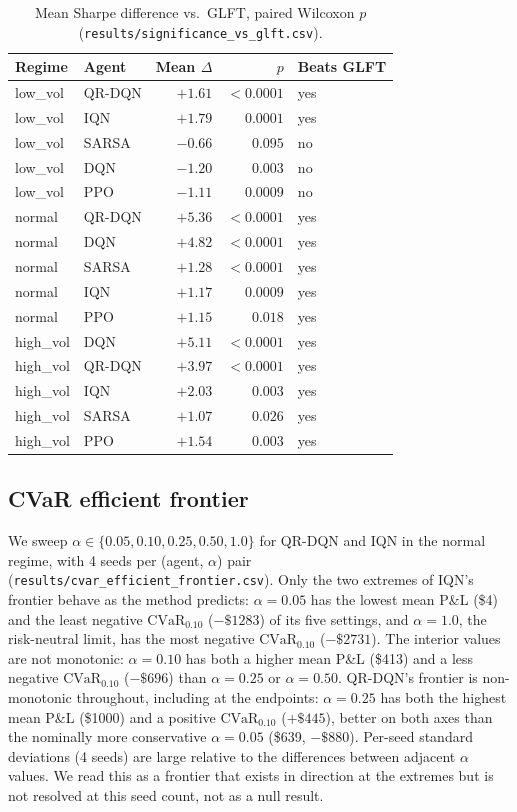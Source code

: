 \documentclass[10pt,twocolumn]{article}
\begin{document}
\begin{table}[t]
\centering\footnotesize
\begin{tabular}{llrrl}
\toprule
Regime & Agent & Mean $\Delta$ & $p$ & Beats GLFT \\
\midrule
low\_vol  & QR-DQN & $+1.61$ & $<0.0001$ & yes \\
low\_vol  & IQN    & $+1.79$ & $0.0001$  & yes \\
low\_vol  & SARSA  & $-0.66$ & $0.095$   & no \\
low\_vol  & DQN    & $-1.20$ & $0.003$   & no \\
low\_vol  & PPO    & $-1.11$ & $0.0009$  & no \\
normal    & QR-DQN & $+5.36$ & $<0.0001$ & yes \\
normal    & DQN    & $+4.82$ & $<0.0001$ & yes \\
normal    & SARSA  & $+1.28$ & $<0.0001$ & yes \\
normal    & IQN    & $+1.17$ & $0.0009$  & yes \\
normal    & PPO    & $+1.15$ & $0.018$   & yes \\
high\_vol & DQN    & $+5.11$ & $<0.0001$ & yes \\
high\_vol & QR-DQN & $+3.97$ & $<0.0001$ & yes \\
high\_vol & IQN    & $+2.03$ & $0.003$   & yes \\
high\_vol & SARSA  & $+1.07$ & $0.026$   & yes \\
high\_vol & PPO    & $+1.54$ & $0.003$   & yes \\
\bottomrule
\end{tabular}
\caption{Mean Sharpe difference vs.\ GLFT, paired Wilcoxon $p$ (\texttt{results/significance\_vs\_glft.csv}).}
\label{tab:glft}
\end{table}

\subsection{CVaR efficient frontier}
We sweep $\alpha\in\{0.05,0.10,0.25,0.50,1.0\}$ for QR-DQN and IQN in the normal regime, with 4 seeds per (agent, $\alpha$) pair (\texttt{results/cvar\_efficient\_frontier.csv}). Only the two extremes of IQN's frontier behave as the method predicts: $\alpha=0.05$ has the lowest mean P\&L (\$4) and the least negative $\mathrm{CVaR}_{0.10}$ ($-\$1283$) of its five settings, and $\alpha=1.0$, the risk-neutral limit, has the most negative $\mathrm{CVaR}_{0.10}$ ($-\$2731$). The interior values are not monotonic: $\alpha=0.10$ has both a higher mean P\&L (\$413) and a less negative $\mathrm{CVaR}_{0.10}$ ($-\$696$) than $\alpha=0.25$ or $\alpha=0.50$. QR-DQN's frontier is non-monotonic throughout, including at the endpoints: $\alpha=0.25$ has both the highest mean P\&L (\$1000) and a positive $\mathrm{CVaR}_{0.10}$ ($+\$445$), better on both axes than the nominally more conservative $\alpha=0.05$ (\$639, $-\$880$). Per-seed standard deviations (4 seeds) are large relative to the differences between adjacent $\alpha$ values. We read this as a frontier that exists in direction at the extremes but is not resolved at this seed count, not as a null result.
\end{document}

